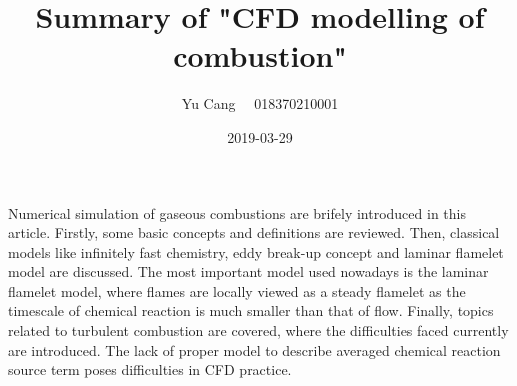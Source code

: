 \documentclass[paper=a4, fontsize=11pt]{scrartcl}
\title{Summary of "CFD modelling of combustion"}
\author{Yu Cang \ \ 018370210001}
\date{2019-03-29}
\begin{document}
\maketitle

Numerical simulation of gaseous combustions are brifely introduced in this article. Firstly, some basic concepts and definitions are reviewed. Then, classical models like infinitely fast chemistry, eddy break-up concept and laminar flamelet model are discussed. The most important model used nowadays is the laminar flamelet model, where flames are locally viewed as a steady flamelet as the timescale of chemical reaction is much smaller than that of flow. Finally, topics related to turbulent combustion are covered, where the difficulties faced currently are introduced. The lack of proper model to describe averaged chemical reaction source term poses difficulties in CFD practice.

	
\end{document}
